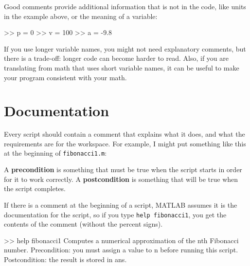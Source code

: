 \documentclass[main.tex]{subfiles}
\begin{document}
Good comments provide additional information that is not in the
code, like units in the example above, or the meaning of a variable:

\begin{code}
>> p = 0         %
>> v = 100       %
>> a = -9.8      %
\end{code}

If you use longer variable names, you might not need explanatory
comments, but there is a trade-off: longer code can become harder
to read.
Also, if you are translating from math
that uses short variable names, it can be useful to make your
program consistent with your math.


\section{Documentation}

Every script should contain a comment that explains
what it does, and what the requirements are for the workspace.  For
example, I might put something like this at the beginning of
{\tt fibonacci1.m}:


\begin{code}
\end{code}

A {\bf precondition} is something that must be true when the script
starts in order for it to work correctly.  A {\bf postcondition}
is something that will be true when the script completes.


If there is a comment at the beginning of a script, MATLAB assumes
it is the documentation for the script, so if you type {\tt help
fibonacci1}, you get the contents of the comment (without the percent
signs).

\begin{code}
>> help fibonacci1
  Computes a numerical approximation of the nth Fibonacci number.  
  Precondition: you must assign a value to n before running this script.
  Postcondition: the result is stored in ans.
\end{code}
\end{document}
